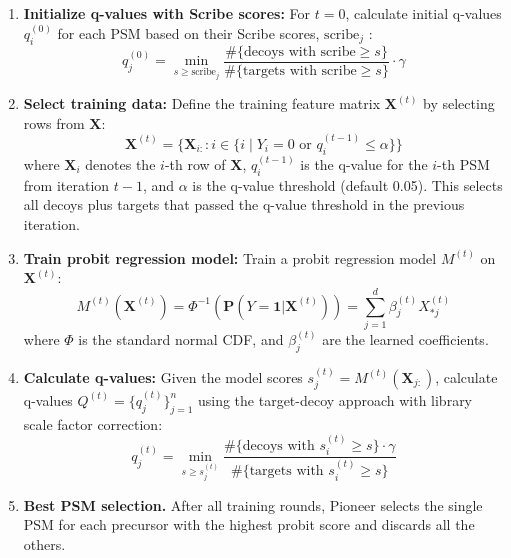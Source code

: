 \documentclass[pdflatex,sn-nature]{sn-jnl}
\begin{document}
\begin{enumerate}
\item{\textbf{Initialize q-values with Scribe scores:} For $t=0$, calculate initial q-values $q_i^{(0)}$ for each PSM based on their Scribe scores, $\text{scribe}_j$ \cite{Searle2023-po}:
\begin{equation}
    q_j^{(0)} = \min_{s \geq \text{scribe}_j} \frac{\#\{\text{decoys with scribe} \geq s\}}{\#\{\text{targets with scribe} \geq s\}} \cdot \gamma
\end{equation}
}

\item{\textbf{Select training data:} Define the training feature matrix $\mathbf{X}^{(t)}$ by selecting rows from $\mathbf{X}$:
\begin{equation}
    \mathbf{X}^{(t)} = \{\mathbf{X}_{i:} : i \in \{i \mid Y_i = 0 \text{ or } q_i^{(t-1)} \leq \alpha\}\}
\end{equation}
where $\mathbf{X}_{i}$ denotes the $i$-th row of $\mathbf{X}$, $q_i^{(t-1)}$ is the q-value for the $i$-th PSM from iteration $t-1$, and $\alpha$ is the q-value threshold (default 0.05). This selects all decoys plus targets that passed the q-value threshold in the previous iteration.
}

\item{\textbf{Train probit regression model:} Train a probit regression model $M^{(t)}$ on $\mathbf{X}^{(t)}$:
\begin{equation}
    M^{(t)}(\mathbf{X}^{(t)}) = \Phi^{-1}(\mathbf{P}(Y = \mathbf{1}|\mathbf{X}^{(t)})) = \sum_{j=1}^d \beta_j^{(t)}X_{*j}^{(t)}
\end{equation}
where $\Phi$ is the standard normal CDF, and $\beta_j^{(t)}$ are the learned coefficients.
}

\item{\textbf{Calculate q-values:} Given the model scores $s_j^{(t)} = M^{(t)}(\mathbf{X}_{j:})$, calculate q-values $Q^{(t)} = \{q_j^{(t)}\}_{j=1}^{n}$ using the target-decoy approach with library scale factor correction:
\begin{equation}
    q_j^{(t)} = \min_{s \geq s_j^{(t)}} \frac{\#\{\text{decoys with } s_i^{(t)} \geq s\} \cdot \gamma}{\#\{\text{targets with } s_i^{(t)} \geq s\}}
\end{equation}
}

\item \textbf{Best PSM selection.} After all training rounds, Pioneer selects the single PSM for each precursor with the highest probit score and discards all the others.


\end{enumerate}
\end{document}
